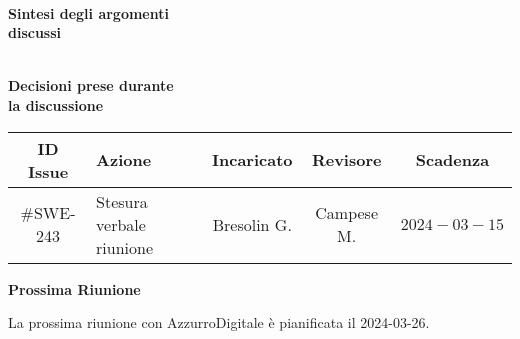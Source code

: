 \documentclass[10pt, a4paper]{article}
\title{\data}
\author{SWEetCode}
\begin{document}


\setlength{\columnsep}{2.2em}
\setlength{\columnseprule}{4pt}
\begin{paracol}{2}


\intestazione
\vspace{5.0em}

\partecipanti

\newpage

\switchcolumn
\revisioneAzioni
\vspace{23.5em}

\ordineGiorno

\newpage


\switchcolumn

\\
\textbf{Sintesi degli argomenti\\discussi}

\newpage


\\
\textbf{Decisioni prese durante\\la discussione}

\switchcolumn

\discussione

\newpage

\decisioni

\end{paracol}

\newpage


{\renewcommand{\arraystretch}{1.5}
\begin{tabularx}{\textwidth}{c|X|c|c|c}
\textbf{ID Issue} & \textbf{Azione} & \textbf{Incaricato} & \textbf{Revisore} & \textbf{Scadenza} \\
\hline
\#SWE-243 &
Stesura verbale riunione &
Bresolin G. &
Campese M. &
$2024-03-15$ \\

\end{tabularx}}

\vspace{3em}


\textbf{Prossima Riunione}

La prossima riunione con AzzurroDigitale è pianificata il 2024-03-26.
\end{document}
